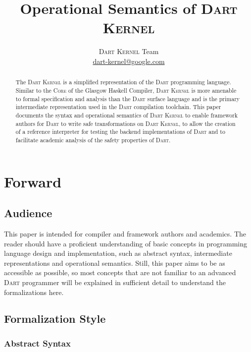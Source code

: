 \documentclass[a4paper,oneside]{article}
\newcommand{\kernel}{\textsc{Dart Kernel}}
\newcommand{\dart}{\textsc{Dart}}
\begin{document}
\title{Operational Semantics of \kernel{}}
\author{\kernel{} Team \\ \href{mailto:dart-kernel@google.com}{dart-kernel@google.com}}

\maketitle

\begin{abstract}

The \kernel{} is a simplified representation of the \dart{} programming language.
Similar to the \textsc{Core} of the Glasgow Haskell Compiler, \kernel{} is more amenable to formal specification and analysis than the \dart{} surface language and is the primary intermediate representation used in the \dart{} compilation toolchain.
This paper documents the syntax and operational semantics of \kernel{} to enable framework authors for \dart{} to write safe transformations on \kernel{}, to allow the creation of a reference interpreter for testing the backend implementations of \dart{} and to facilitate academic analysis of the safety properties of \dart{}.

\end{abstract}

\setcounter{tocdepth}{2}
\tableofcontents

\section{Forward}

\subsection{Audience}
This paper is intended for compiler and framework authors and academics.
The reader should have a proficient understanding of basic concepts in programming language design and implementation, such as abstract syntax, intermediate representations and operational semantics.
Still, this paper aims to be as accessible as possible, so most concepts that are not familiar to an advanced \dart{} programmer will be explained in sufficient detail to understand the formalizations here.

\subsection{Formalization Style}

\subsubsection{Abstract Syntax}
\end{document}

